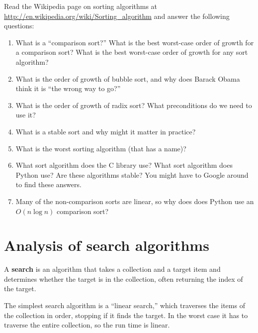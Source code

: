 \documentclass[10pt]{book}
\begin{document}
\begin{exercise}

Read the Wikipedia page on sorting algorithms at
\url{http://en.wikipedia.org/wiki/Sorting_algorithm} and answer
the following questions:

\begin{enumerate}

\item What is a ``comparison sort?'' What is the best worst-case order
  of growth for a comparison sort?  What is the best worst-case order
  of growth for any sort algorithm?

\item What is the order of growth of bubble sort, and why does Barack
  Obama think it is ``the wrong way to go?''

\item What is the order of growth of radix sort?  What preconditions
  do we need to use it?

\item What is a stable sort and why might it matter in practice?

\item What is the worst sorting algorithm (that has a name)?

\item What sort algorithm does the C library use?  What sort algorithm
  does Python use?  Are these algorithms stable?  You might have to
  Google around to find these answers.

\item Many of the non-comparison sorts are linear, so why does does
  Python use an $O(n \log n)$ comparison sort?

\end{enumerate}

\end{exercise}


\section{Analysis of search algorithms}

A {\bf search} is an algorithm that takes a collection and a target
item and determines whether the target is in the collection, often
returning the index of the target.

The simplest search algorithm is a ``linear search,'' which traverses
the items of the collection in order, stopping if it finds the target.
In the worst case it has to traverse the entire collection, so the run
time is linear.
\end{document}
